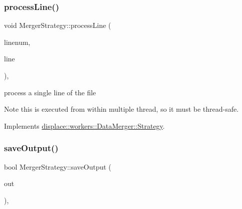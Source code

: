 \mbox{\label{classdisplace_1_1workers_1_1_merger_strategy_aa434bb1a89c47003426c9d7d41995d58}} 
\subsubsection{\texorpdfstring{processLine()}{processLine()}}
{\footnotesize\ttfamily void Merger\+Strategy\+::process\+Line (\begin{DoxyParamCaption}\item[{int}]{linenum,  }\item[{Q\+String}]{line }\end{DoxyParamCaption})\hspace{0.3cm}{\ttfamily [override]}, {\ttfamily [virtual]}}



process a single line of the file 

\begin{DoxyNote}{Note}
this is executed from within multiple thread, so it must be thread-\/safe. 
\end{DoxyNote}


Implements \mbox{\hyperlink{classdisplace_1_1workers_1_1_data_merger_1_1_strategy_affc6b82b186a4e8fbe2c8adf0a3d136a}{displace\+::workers\+::\+Data\+Merger\+::\+Strategy}}.

\mbox{\label{classdisplace_1_1workers_1_1_merger_strategy_a5e0908a7d6b0a75f4e877711a386d7be}} 
\subsubsection{\texorpdfstring{saveOutput()}{saveOutput()}}
{\footnotesize\ttfamily bool Merger\+Strategy\+::save\+Output (\begin{DoxyParamCaption}\item[{Q\+String}]{out }\end{DoxyParamCaption})\hspace{0.3cm}{\ttfamily [override]}, {\ttfamily [virtual]}}



